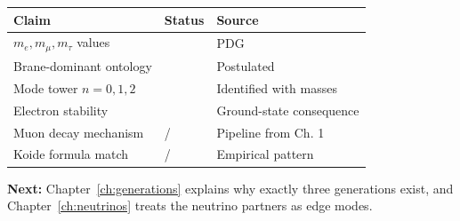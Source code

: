 \begin{tcolorbox}[colback=orange!5, colframe=orange!50!black,
    title=\textbf{Epistemic Audit: Chapter 7}]
\begin{center}
\begin{tabular}{lll}
\toprule
\textbf{Claim} & \textbf{Status} & \textbf{Source} \\
\midrule
$m_e, m_\mu, m_\tau$ values & \tagBL{} & PDG \\
Brane-dominant ontology & \tagP{} & Postulated \\
Mode tower $n = 0, 1, 2$ & \tagI{} & Identified with masses \\
Electron stability & \tagDc{} & Ground-state consequence \\
Muon decay mechanism & \tagDc{}/\tagP{} & Pipeline from Ch. 1 \\
Koide formula match & \tagBL{}/\tagI{} & Empirical pattern \\
\bottomrule
\end{tabular}
\end{center}
\end{tcolorbox}

\textbf{Next:} Chapter~\ref{ch:generations} explains why exactly three generations
exist, and Chapter~\ref{ch:neutrinos} treats the neutrino partners as edge modes.

